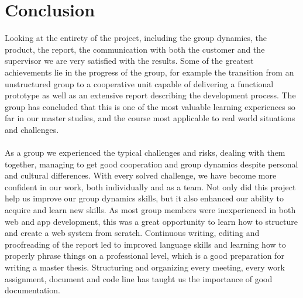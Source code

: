 \newpage
\section{Conclusion} 
Looking at the entirety of the project, including the group dynamics, the product, the report, the communication with both the customer and the supervisor we are very satisfied with the results. Some of the greatest achievements lie in the progress of the group, for example the transition from an unstructured group to a cooperative unit capable of delivering a functional prototype as well as an extensive report describing the development process. The group has concluded that this is one of the most valuable learning experiences so far in our master studies, and the course most applicable to real world situations and challenges.

\paragraph{} As a group we experienced the typical challenges and risks, dealing with them together, managing to get good cooperation and group dynamics despite personal and cultural differences. With every solved challenge, we have become more confident in our work, both individually and as a team. Not only did this project help us improve our group dynamics skills, but it also enhanced our ability to acquire and learn new skills. As most group members were inexperienced in both web and app development, this was a great opportunity to learn how to structure and create a web system from scratch. Continuous writing, editing and proofreading of the report led to improved language skills and learning how to properly phrase things on a professional level, which is a good preparation for writing a master thesis. Structuring and organizing every meeting, every work assignment, document and code line has taught us the importance of good documentation.

